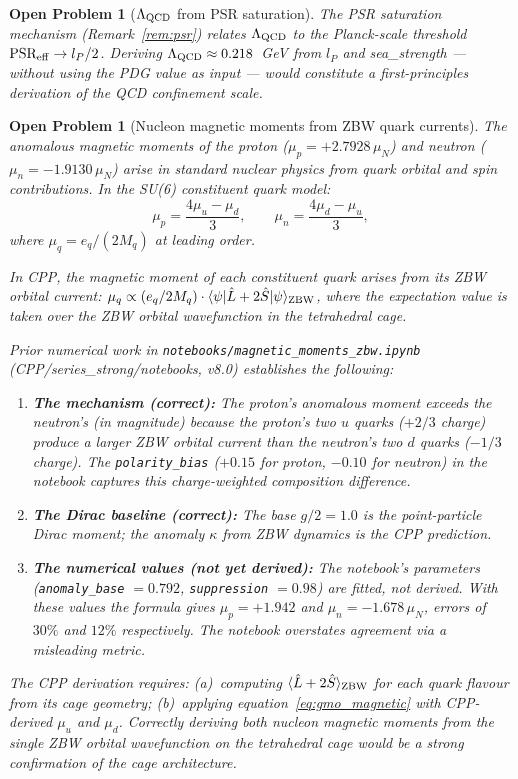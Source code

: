\documentclass[11pt,letterpaper]{article}
\newtheorem{openprob}[theorem]{Open Problem}
\newcommand{\lP}{l_P}
\begin{document}
\begin{openprob}[$\Lambda_{\rm QCD}$ from PSR saturation]
\label{op:lambda_psr}
The PSR saturation mechanism (Remark~\ref{rem:psr}) relates
$\Lambda_{\rm QCD}$ to the Planck-scale threshold
$\text{PSR}_{\rm eff} \to \lP/2$.  Deriving $\Lambda_{\rm QCD}
\approx 0.218$~GeV from $\lP$ and sea\_strength --- without
using the PDG value as input --- would constitute a first-principles
derivation of the QCD confinement scale.
\end{openprob}

\begin{openprob}[Nucleon magnetic moments from ZBW quark currents]
\label{op:mag_moments}
The anomalous magnetic moments of the proton ($\mu_p = +2.7928\,\mu_N$)
and neutron ($\mu_n = -1.9130\,\mu_N$) arise in standard nuclear
physics from quark orbital and spin contributions.  In the SU(6)
constituent quark model:
\begin{equation}
\mu_p = \frac{4\mu_u - \mu_d}{3}, \qquad
\mu_n = \frac{4\mu_d - \mu_u}{3},
\label{eq:gmo_magnetic}
\end{equation}
where $\mu_q = e_q / (2 M_q)$ at leading order.

In CPP, the magnetic moment of each constituent quark arises from its
ZBW orbital current: $\mu_q \propto (e_q / 2 M_q) \cdot
\langle\psi|\hat{L} + 2\hat{S}|\psi\rangle_{\rm ZBW}$, where the
expectation value is taken over the ZBW orbital wavefunction in the
tetrahedral cage.

Prior numerical work in \texttt{notebooks/magnetic\_moments\_zbw.ipynb}
(CPP/series\_strong/notebooks, v8.0) establishes the following:
\begin{enumerate}
\item \textbf{The mechanism (correct):} The proton's anomalous moment
  exceeds the neutron's (in magnitude) because the proton's two $u$
  quarks ($+2/3$ charge) produce a larger ZBW orbital current than
  the neutron's two $d$ quarks ($-1/3$ charge).  The
  \texttt{polarity\_bias} ($+0.15$ for proton, $-0.10$ for neutron)
  in the notebook captures this charge-weighted composition
  difference.
\item \textbf{The Dirac baseline (correct):} The base $g/2 = 1.0$
  is the point-particle Dirac moment; the anomaly $\kappa$ from ZBW
  dynamics is the CPP prediction.
\item \textbf{The numerical values (not yet derived):}
  The notebook's parameters (\texttt{anomaly\_base} $= 0.792$,
  \texttt{suppression} $= 0.98$) are fitted, not derived.  With
  these values the formula gives $\mu_p = +1.942$ and $\mu_n =
  -1.678\,\mu_N$, errors of $30\%$ and $12\%$ respectively.
  The notebook overstates agreement via a misleading metric.
\end{enumerate}

The CPP derivation requires: (a)~computing
$\langle\hat{L}+2\hat{S}\rangle_{\rm ZBW}$ for each quark flavour
from its cage geometry; (b)~applying equation~\eqref{eq:gmo_magnetic}
with CPP-derived $\mu_u$ and $\mu_d$.  Correctly deriving both
nucleon magnetic moments from the single ZBW orbital wavefunction
on the tetrahedral cage would be a strong confirmation of the cage
architecture.
\end{openprob}
\end{document}
